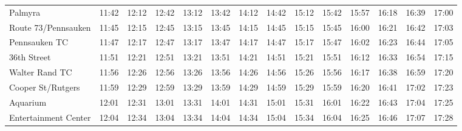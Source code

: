 \begin{center}
\begin{tabular}{@{}lrrrrrrrrrrrrr@{}}
Palmyra & 11:42 & 12:12 & 12:42 & 13:12 & 13:42 & 14:12 & 14:42 & 15:12 & 15:42 & 15:57 & 16:18 & 16:39 & 17:00 \\
Route 73/Pennsauken & 11:45 & 12:15 & 12:45 & 13:15 & 13:45 & 14:15 & 14:45 & 15:15 & 15:45 & 16:00 & 16:21 & 16:42 & 17:03 \\
Pennsauken TC & 11:47 & 12:17 & 12:47 & 13:17 & 13:47 & 14:17 & 14:47 & 15:17 & 15:47 & 16:02 & 16:23 & 16:44 & 17:05 \\
36th Street & 11:51 & 12:21 & 12:51 & 13:21 & 13:51 & 14:21 & 14:51 & 15:21 & 15:51 & 16:12 & 16:33 & 16:54 & 17:15 \\
Walter Rand TC & 11:56 & 12:26 & 12:56 & 13:26 & 13:56 & 14:26 & 14:56 & 15:26 & 15:56 & 16:17 & 16:38 & 16:59 & 17:20 \\
Cooper St/Rutgers & 11:59 & 12:29 & 12:59 & 13:29 & 13:59 & 14:29 & 14:59 & 15:29 & 15:59 & 16:20 & 16:41 & 17:02 & 17:23 \\
Aquarium & 12:01 & 12:31 & 13:01 & 13:31 & 14:01 & 14:31 & 15:01 & 15:31 & 16:01 & 16:22 & 16:43 & 17:04 & 17:25 \\
Entertainment Center & 12:04 & 12:34 & 13:04 & 13:34 & 14:04 & 14:34 & 15:04 & 15:34 & 16:04 & 16:25 & 16:46 & 17:07 & 17:28 \\
\bottomrule\end{tabular}\end{center}
